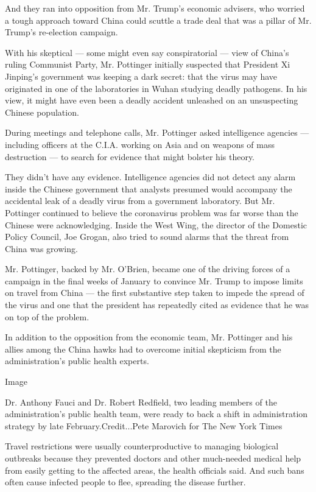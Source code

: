 And they ran into opposition from Mr. Trump's economic advisers, who
worried a tough approach toward China could scuttle a trade deal that
was a pillar of Mr. Trump's re-election campaign.

With his skeptical --- some might even say conspiratorial --- view of
China's ruling Communist Party, Mr. Pottinger initially suspected that
President Xi Jinping's government was keeping a dark secret: that the
virus may have originated in one of the laboratories in Wuhan studying
deadly pathogens. In his view, it might have even been a deadly accident
unleashed on an unsuspecting Chinese population.

During meetings and telephone calls, Mr. Pottinger asked intelligence
agencies --- including officers at the C.I.A. working on Asia and on
weapons of mass destruction --- to search for evidence that might
bolster his theory.

They didn't have any evidence. Intelligence agencies did not detect any
alarm inside the Chinese government that analysts presumed would
accompany the accidental leak of a deadly virus from a government
laboratory. But Mr. Pottinger continued to believe the coronavirus
problem was far worse than the Chinese were acknowledging. Inside the
West Wing, the director of the Domestic Policy Council, Joe Grogan, also
tried to sound alarms that the threat from China was growing.

Mr. Pottinger, backed by Mr. O'Brien, became one of the driving forces
of a campaign in the final weeks of January to convince Mr. Trump to
impose limits on travel from China --- the first substantive step taken
to impede the spread of the virus and one that the president has
repeatedly cited as evidence that he was on top of the problem.

In addition to the opposition from the economic team, Mr. Pottinger and
his allies among the China hawks had to overcome initial skepticism from
the administration's public health experts.

Image

Dr. Anthony Fauci and Dr. Robert Redfield, two leading members of the
administration's public health team, were ready to back a shift in
administration strategy by late February.Credit...Pete Marovich for The
New York Times

Travel restrictions were usually counterproductive to managing
biological outbreaks because they prevented doctors and other
much-needed medical help from easily getting to the affected areas, the
health officials said. And such bans often cause infected people to
flee, spreading the disease further.

